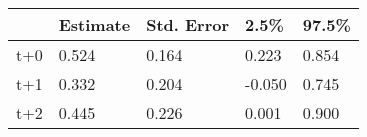 \begin{tabular}{lllll}
  \toprule
  & Estimate & Std. Error & 2.5\% & 97.5\% \\ 
  \midrule
t+0 & 0.524 & 0.164 & 0.223 & 0.854 \\ 
  t+1 & 0.332 & 0.204 & -0.050 & 0.745 \\ 
  t+2 & 0.445 & 0.226 & 0.001 & 0.900 \\ 
   \bottomrule
\end{tabular}

